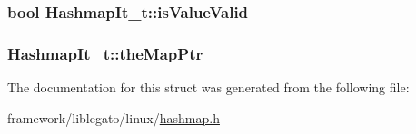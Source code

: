 \subsubsection[{\texorpdfstring{is\+Value\+Valid}{isValueValid}}]{\setlength{\rightskip}{0pt plus 5cm}bool Hashmap\+It\+\_\+t\+::is\+Value\+Valid}\hypertarget{struct_hashmap_it__t_a04019466db04827112bc2963f67e19e1}{}\label{struct_hashmap_it__t_a04019466db04827112bc2963f67e19e1}
\subsubsection[{\texorpdfstring{the\+Map\+Ptr}{theMapPtr}}]{ Hashmap\+It\+\_\+t\+::the\+Map\+Ptr}\hypertarget{struct_hashmap_it__t_a22d2df8388e822a531d93c3ed597285a}{}\label{struct_hashmap_it__t_a22d2df8388e822a531d93c3ed597285a}


The documentation for this struct was generated from the following file\+:\begin{DoxyCompactItemize}
\item 
framework/liblegato/linux/\hyperlink{hashmap_8h}{hashmap.\+h}\end{DoxyCompactItemize}
